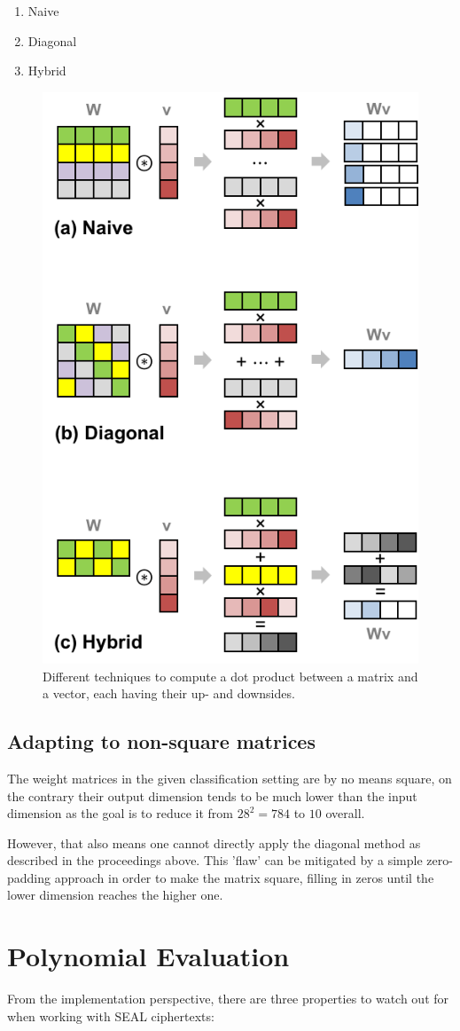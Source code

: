 \begin{enumerate}
  \item Naive
  \item Diagonal
  \item Hybrid
\end{enumerate}

\begin{figure}
  \centering
  \includegraphics[width=0.4\linewidth]{figures/matrix-vector-multiplication-techniques.png}
  \caption[Image source: \cite{2018-gazelle}]{Different techniques to compute a dot product between a matrix and a vector,
    each having their up- and downsides.}
\end{figure}

\subsection{Adapting to non-square matrices}
The weight matrices in the given classification setting
are by no means square, on the contrary their output dimension tends
to be much lower than the input dimension as the goal is to reduce it from
$28^2 = 784$ to $10$ overall.

However, that also means one cannot directly apply the diagonal method
as described in the proceedings above.
This 'flaw' can be mitigated by a simple zero-padding approach
in order to make the matrix square, filling in zeros until
the lower dimension reaches the higher one.

\section{Polynomial Evaluation}
From the implementation perspective, there are three properties to watch out for when
working with SEAL ciphertexts:

